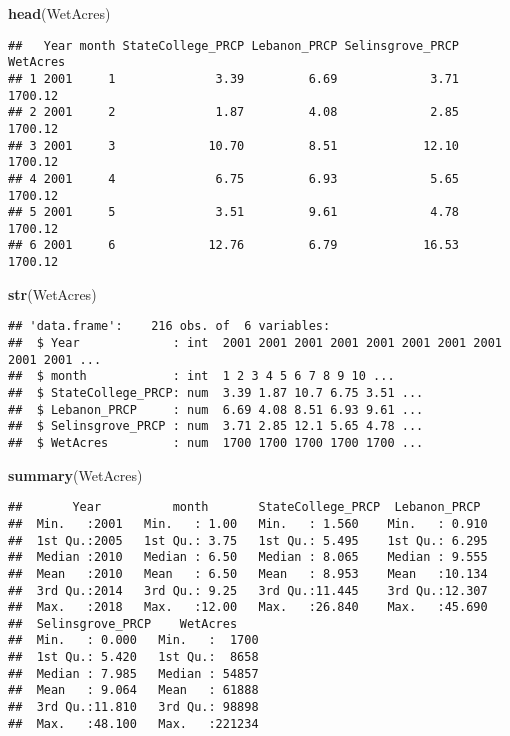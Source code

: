 \documentclass[]{article}
\newenvironment{Shaded}{\begin{snugshade}}{\end{snugshade}}
\newcommand{\KeywordTok}[1]{\textcolor[rgb]{0.13,0.29,0.53}{\textbf{{#1}}}}
\newcommand{\NormalTok}[1]{{#1}}
\begin{document}
\begin{Shaded}
\begin{Highlighting}[]
\KeywordTok{head}\NormalTok{(WetAcres)}
\end{Highlighting}
\end{Shaded}

\begin{verbatim}
##   Year month StateCollege_PRCP Lebanon_PRCP Selinsgrove_PRCP WetAcres
## 1 2001     1              3.39         6.69             3.71  1700.12
## 2 2001     2              1.87         4.08             2.85  1700.12
## 3 2001     3             10.70         8.51            12.10  1700.12
## 4 2001     4              6.75         6.93             5.65  1700.12
## 5 2001     5              3.51         9.61             4.78  1700.12
## 6 2001     6             12.76         6.79            16.53  1700.12
\end{verbatim}

\begin{Shaded}
\begin{Highlighting}[]
\KeywordTok{str}\NormalTok{(WetAcres)}
\end{Highlighting}
\end{Shaded}

\begin{verbatim}
## 'data.frame':    216 obs. of  6 variables:
##  $ Year             : int  2001 2001 2001 2001 2001 2001 2001 2001 2001 2001 ...
##  $ month            : int  1 2 3 4 5 6 7 8 9 10 ...
##  $ StateCollege_PRCP: num  3.39 1.87 10.7 6.75 3.51 ...
##  $ Lebanon_PRCP     : num  6.69 4.08 8.51 6.93 9.61 ...
##  $ Selinsgrove_PRCP : num  3.71 2.85 12.1 5.65 4.78 ...
##  $ WetAcres         : num  1700 1700 1700 1700 1700 ...
\end{verbatim}

\begin{Shaded}
\begin{Highlighting}[]
\KeywordTok{summary}\NormalTok{(WetAcres)}
\end{Highlighting}
\end{Shaded}

\begin{verbatim}
##       Year          month       StateCollege_PRCP  Lebanon_PRCP   
##  Min.   :2001   Min.   : 1.00   Min.   : 1.560    Min.   : 0.910  
##  1st Qu.:2005   1st Qu.: 3.75   1st Qu.: 5.495    1st Qu.: 6.295  
##  Median :2010   Median : 6.50   Median : 8.065    Median : 9.555  
##  Mean   :2010   Mean   : 6.50   Mean   : 8.953    Mean   :10.134  
##  3rd Qu.:2014   3rd Qu.: 9.25   3rd Qu.:11.445    3rd Qu.:12.307  
##  Max.   :2018   Max.   :12.00   Max.   :26.840    Max.   :45.690  
##  Selinsgrove_PRCP    WetAcres     
##  Min.   : 0.000   Min.   :  1700  
##  1st Qu.: 5.420   1st Qu.:  8658  
##  Median : 7.985   Median : 54857  
##  Mean   : 9.064   Mean   : 61888  
##  3rd Qu.:11.810   3rd Qu.: 98898  
##  Max.   :48.100   Max.   :221234
\end{verbatim}
\end{document}
